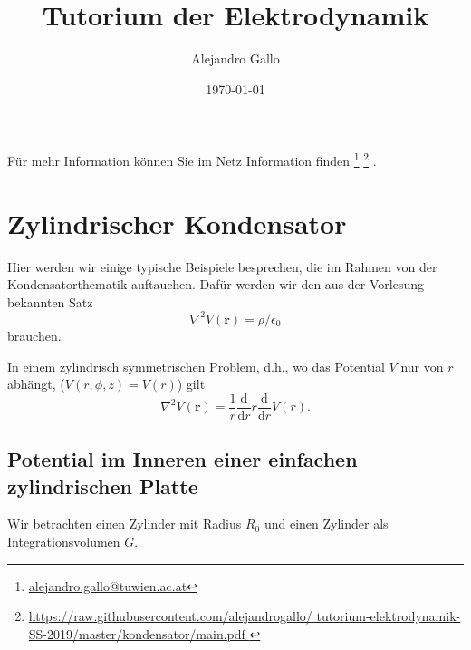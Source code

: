 \documentclass[A4paper, 12pt]{amsart}
\title{Tutorium der Elektrodynamik}
\author{Alejandro Gallo}
\date{\today}
\makeatletter
\newcommand\sourcefootnotes{
\footnote{\tiny \url{alejandro.gallo@tuwien.ac.at} }
\footnote{\tiny
  \url{
    https://raw.githubusercontent.com/alejandrogallo/
    tutorium-elektrodynamik-SS-2019/master/kondensator/main.pdf
  }
}
}
\makeatother
\begin{document}
\maketitle
\tableofcontents

Für mehr Information können Sie im Netz Information finden\sourcefootnotes.

\section{Zylindrischer Kondensator}
Hier werden wir einige typische Beispiele
besprechen, die im Rahmen von der Kondensatorthematik
auftauchen.
Dafür werden wir den aus der Vorlesung bekannten Satz
%
\begin{equation}
  \label{eq:gauss_theorem}
  \nabla ^{2} V(\mathbf{r}) = \rho / \epsilon_{0}
\end{equation}
%
brauchen.

In einem zylindrisch symmetrischen Problem, d.h., wo das Potential
$ V $ nur von $ r $ abhängt, ($ V(r, \phi, z) = V(r) $) gilt
%
\begin{equation}
  \label{eq:laplacian_in_cylindrical_coordinates}
  \nabla ^{2} V(\mathbf{r}) =
  \frac{1}{r}
  \frac{\mathrm{d}}{\mathrm{d}r}
  r
  \frac{\mathrm{d}}{\mathrm{d}r}
  V(r)
  .
\end{equation}
%

\newpage
\subsection{Potential im Inneren einer einfachen zylindrischen Platte}

Wir betrachten einen Zylinder mit Radius $ R_{0} $ und einen
Zylinder als Integrationsvolumen $ G $.

\begin{center}
  
\end{center}
\end{document}
